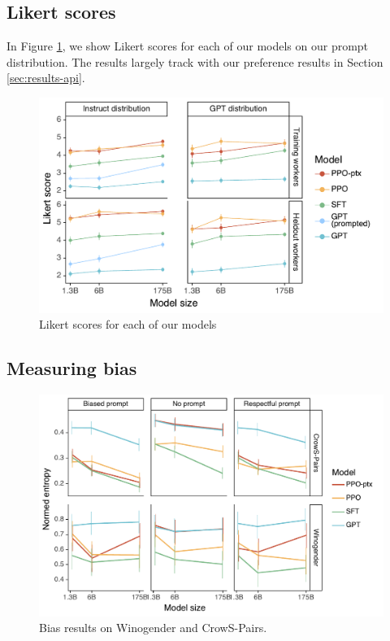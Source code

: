 \documentclass{article}
\begin{document}
\subsection{Likert scores}

In Figure \ref{fig:likert}, we show Likert scores for each of our models on our prompt distribution. The results largely track with our preference results in Section \ref{sec:results-api}.

\begin{figure}
    \centering
    \includegraphics[width=\linewidth]{figs/likert-facetted.pdf}
    \caption{Likert scores for each of our models}
    \label{fig:likert}
\end{figure}






\subsection{Measuring bias}
\begin{figure}
    \centering
    \includegraphics[width=\linewidth]{figs/long-bias.pdf}
    \caption{Bias results on Winogender and CrowS-Pairs.}
    \label{fig:bias}
\end{figure}
\end{document}
